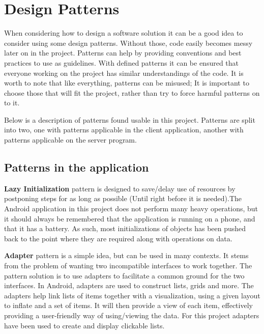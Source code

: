 \section{Design Patterns}
When considering how to design a software solution it can be a good idea to consider using some design patterns. Without those, code easily becomes messy later on in the project. Patterns can help by providing conventions and best practices to use as guidelines. With defined patterns it can be ensured that everyone working on the project has similar understandings of the code. It is worth to note that like everything, patterns can be misused; It is important to choose those that will fit the project, rather than try to force harmful patterns on to it. 

Below is a description of patterns found usable in this project. Patterns are split into two, one with patterns applicable in the client application, another with patterns applicable on the server program.

\subsection{Patterns in the application}

\textbf{Lazy Initialization} pattern is designed to save/delay use of resources by postponing steps for as long as possible (Until right before it is needed).The Android application in this project does not perform many heavy operations, but it should always be remembered that the application is running on a phone, and that it has a battery. As such, most initializations of objects has been pushed back to the point where they are required along with operations on data.

\textbf{Adapter} pattern is a simple idea, but can be used in many contexts. It stems from the problem of wanting two incompatible interfaces to work together. The pattern solution is to use adapters to facilitate a common ground for the two interfaces. In Android, adapters are used to construct lists, grids and more. The adapters help link lists of items together with a visualization, using a given layout to inflate and a set of items. It will then provide a view of each item, effectively providing a user-friendly way of using/viewing the data. For this project adapters have been used to create and display clickable lists.


